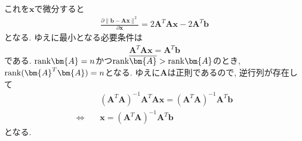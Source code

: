 \documentclass[dvipdfmx,titlepage, 11pt, a4paper]{jsarticle}%
\begin{document}
\begin{enumerate}[(1)]
\begin{eqnarray*}
	      \end{eqnarray*}
	      これを$\bm{x}$で微分すると
	      \begin{eqnarray*}
		      \frac{\partial \|\bm{b-Ax}\|^{2}}{\partial \bm{x}} = 2\bm{A}^{T}\bm{A}\bm{x}-2\bm{A}^{T}\bm{b}
	      \end{eqnarray*}
	      となる. ゆえに最小となる必要条件は
	      \begin{eqnarray*}
		      \bm{A}^{T}\bm{A}\bm{x}=\bm{A}^{T}\bm{b}
	      \end{eqnarray*}
	      である. ${\rm rank}\bm{A}=n$かつ${\rm rank}\overline{\bm{A}}>{\rm rank}\bm{A}$のとき, ${\rm rank}(\bm{A}^{T}\bm{A})=n$となる. ゆえに$\bm{A}$は正則であるので, 逆行列が存在して
	      \begin{eqnarray*}
		      &&(\bm{A}^{T}\bm{A})^{-1}\bm{A}^{T}\bm{A}\bm{x}=(\bm{A}^{T}\bm{A})^{-1}\bm{A}^{T}\bm{b}\\
		      \Longleftrightarrow\ && \bm{x}=(\bm{A}^{T}\bm{A})^{-1}\bm{A}^{T}\bm{b}
	      \end{eqnarray*}
	      となる.
\end{enumerate}
\newpage
\section{}%
\end{document}
